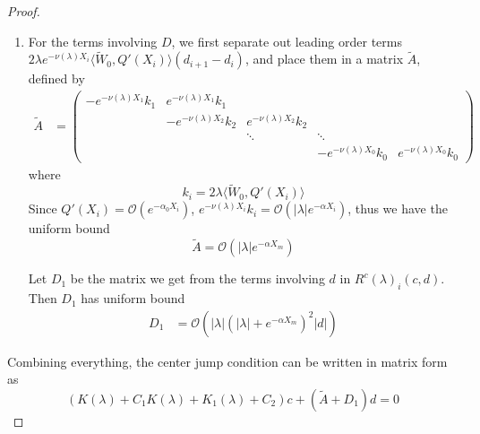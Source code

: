 \documentclass[thesis.tex]{subfiles}
\begin{document}
\begin{lemma}
\begin{proof}
\begin{enumerate}
\item For the terms involving $D$, we first separate out leading order terms $2 \lambda e^{-\nu(\lambda)X_i} \langle \tilde{W}_0, Q'(X_i) \rangle (d_{i+1} - d_i )$, and place them in a matrix $\tilde{A}$, defined by
\begin{align*}
\tilde{A} &= \begin{pmatrix}
-e^{-\nu(\lambda)X_1} k_1 & e^{-\nu(\lambda)X_1} k_1 \\
& -e^{-\nu(\lambda)X_2} k_2 & e^{-\nu(\lambda)X_2} k_2 \\
& & \ddots & \ddots \\
& &  & -e^{-\nu(\lambda)X_0} k_0 & e^{-\nu(\lambda)X_0} k_0
\end{pmatrix}
\end{align*}
where
\[
k_i = 2 \lambda \langle \tilde{W}_0, Q'(X_i) \rangle
\]
Since $Q'(X_i) = \mathcal{O}(e^{-\alpha_0 X_i})$, $e^{-\nu(\lambda)X_i} k_i = \mathcal{O}(|\lambda|e^{-\alpha X_i})$, thus we have the uniform bound
\[
\tilde{A} = \mathcal{O}(|\lambda|e^{-\alpha X_m})
\]

Let $D_1$ be the matrix we get from the terms involving $d$ in $R^c(\lambda)_i(c, d)$. Then $D_1$ has uniform bound
\begin{align*}
D_1 &= \mathcal{O}(|\lambda|(|\lambda| + e^{-\alpha X_m})^2|d|)
\end{align*}
\end{enumerate}

Combining everything, the center jump condition can be written in matrix form as
\[
(K(\lambda) + C_1 K(\lambda) + K_1(\lambda) + C_2) c + (\tilde{A} + D_1) d = 0
\]
\end{proof}
\end{lemma}
\end{document}
